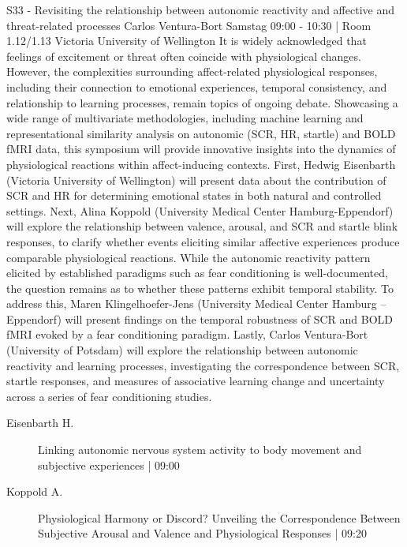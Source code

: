 
            \begin{symposium}
            {S33 - Revisiting the relationship between autonomic reactivity and affective and threat-related processes }
            {Carlos Ventura-Bort }
            {Samstag 09:00 - 10:30 | Room 1.12/1.13}
            {Victoria University of Wellington}
            It is widely acknowledged that feelings of excitement or threat often coincide with physiological changes. However, the complexities surrounding affect-related physiological responses, including their connection to emotional experiences, temporal consistency, and relationship to learning processes, remain topics of ongoing debate. Showcasing a wide range of multivariate methodologies, including machine learning and representational similarity analysis on autonomic (SCR, HR, startle) and BOLD fMRI data, this symposium will provide innovative insights into the dynamics of physiological reactions within affect-inducing contexts.
First, Hedwig Eisenbarth (Victoria University of Wellington) will present data about the contribution of SCR and HR for determining emotional states in both natural and controlled settings. Next, Alina Koppold (University Medical Center Hamburg-Eppendorf) will explore the relationship between valence, arousal, and SCR and startle blink responses, to clarify whether events eliciting similar affective experiences produce comparable physiological reactions. While the autonomic reactivity pattern elicited by established paradigms such as fear conditioning is well-documented, the question remains as to whether these patterns exhibit temporal stability. To address this, Maren Klingelhoefer-Jens (University Medical Center Hamburg – Eppendorf) will present findings on the temporal robustness of SCR and BOLD fMRI evoked by a fear conditioning paradigm. Lastly, Carlos Ventura-Bort (University of Potsdam) will explore the relationship between autonomic reactivity and learning processes, investigating the correspondence between SCR, startle responses, and measures of associative learning change and uncertainty across a series of fear conditioning studies.
            \begin{description}    
            
                \item [ Eisenbarth H.] Linking autonomic nervous system activity to body movement and subjective experiences \textcolor{mygray}{ | 09:00}    
                
                \item [ Koppold A.] Physiological Harmony or Discord? Unveiling the Correspondence Between Subjective Arousal and Valence and Physiological Responses \textcolor{mygray}{ | 09:20}    
                

\end{description}
\end{symposium}
